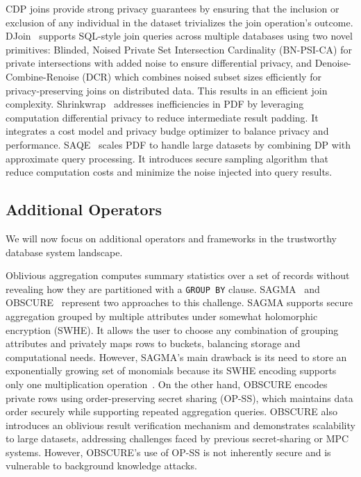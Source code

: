 \documentclass[11pt]{article}
\newcommand{\shortsection}[1]{\vspace{0.2em}\noindent {\bf #1.}}
\begin{document}
\shortsection{CDP Joins} CDP joins provide strong privacy guarantees by ensuring that the inclusion or exclusion of any individual in the dataset trivializes the join operation's outcome. DJoin~\cite{narayan2012djoin} supports SQL-style join queries across multiple databases using two novel primitives: Blinded, Noised Private Set Intersection Cardinality (BN-PSI-CA) for private intersections with added noise to ensure differential privacy, and Denoise-Combine-Renoise (DCR) which combines noised subset sizes efficiently for privacy-preserving joins on distributed data. This results in an efficient join complexity. Shrinkwrap~\cite{bater2018shrinkwrap} addresses inefficiencies in PDF by leveraging computation differential privacy to reduce intermediate result padding. It integrates a cost model and privacy budge optimizer to balance privacy and performance. SAQE~\cite{bater2020saqe} scales PDF to handle large datasets by combining DP with approximate query processing. It introduces secure sampling algorithm that reduce computation costs and minimize the noise injected into query results.  


\subsection{Additional Operators}

We will now focus on additional operators and frameworks in the trustworthy database system landscape.

\shortsection{Oblivious Aggregate}
Oblivious aggregation computes summary statistics over a set of records without revealing how they are partitioned with a {\tt GROUP BY} clause. {\sc SAGMA}~\cite{hackenjos2020sagma} and {\sc OBSCURE}~\cite{gupta12obscure} represent two approaches to this challenge. {\sc SAGMA} supports secure aggregation grouped by multiple attributes under somewhat holomorphic encryption (SWHE). It allows the user to choose any combination of grouping attributes and privately maps rows to buckets, balancing storage and computational needs. However, {\sc SAGMA}'s main drawback is its need to store an exponentially growing set of monomials because its SWHE encoding supports only one multiplication operation~\cite{ren2022heda}. On the other hand, {\sc OBSCURE} encodes private rows using order-preserving secret sharing (OP-SS), which maintains data order securely while supporting repeated aggregation queries. {\sc OBSCURE} also introduces an oblivious result verification mechanism and demonstrates scalability to large datasets, addressing challenges faced by previous secret-sharing or MPC systems. However, {\sc OBSCURE}'s use of OP-SS is not inherently secure and is vulnerable to background knowledge attacks. 
\end{document}
